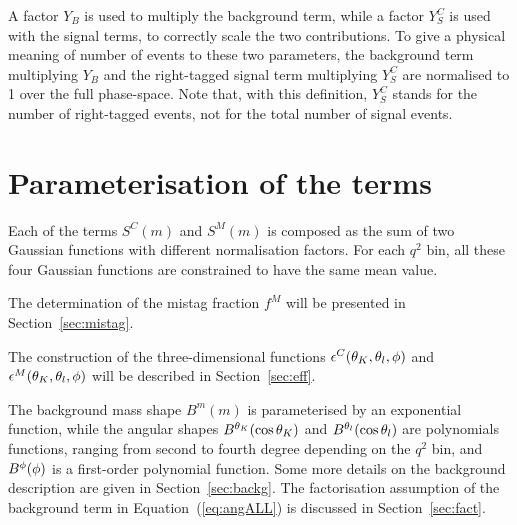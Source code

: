 A factor $Y_{B}$ is used to multiply the background term, while a factor $Y^{C}_{S}$ is used with the signal terms, to correctly scale the two contributions.
To give a physical meaning of number of events to these two parameters, the background term multiplying $Y_{B}$ and the right-tagged signal term multiplying $Y^{C}_{S}$ are normalised to 1 over the full phase-space.
Note that, with this definition, $Y^{C}_{S}$ stands for the number of right-tagged events, not for the total number of signal events.

\section{Parameterisation of the \pdf terms}
\label{sec:pdf-param}


Each of the terms $S^{C}(m)$ and $S^{M}(m)$ is composed as the sum of two Gaussian functions with different normalisation factors.
For each $q^2$ bin, all these four Gaussian functions are constrained to have the same mean value.

The determination of the mistag fraction $f^{M}$ will be presented in Section~\ref{sec:mistag}.


The construction of the three-dimensional functions $\epsilon^{C}(\theta_K,\theta_l,\phi)$ and $\epsilon^{M}(\theta_K,\theta_l,\phi)$ will be described in Section~\ref{sec:eff}.

The background mass shape $B^m(m)$ is parameterised by an exponential function, while the angular shapes $B^{\theta_K}(\cos\theta_K)$ and $B^{\theta_l}(\cos\theta_l)$ are polynomials functions, ranging from second to fourth degree depending on the $q^2$ bin, and $B^{\phi}(\phi)$ is a first-order polynomial function.
Some more details on the background description are given in Section~\ref{sec:backg}.
The factorisation assumption of the background term in Equation~(\ref{eq:angALL}) is discussed in Section~\ref{sec:fact}.


